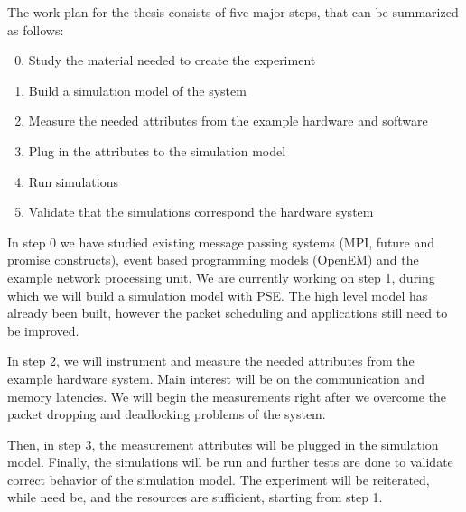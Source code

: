 The work plan for the thesis consists of five major steps, that can be summarized as follows:

\begin{enumerate}
\setcounter{enumi}{-1}
\item Study the material needed to create the experiment
\item Build a simulation model of the system
\item Measure the needed attributes from the example hardware and software
\item Plug in the attributes to the simulation model
\item Run simulations
\item Validate that the simulations correspond the hardware system
\end{enumerate}

In step 0 we have studied existing message passing systems (MPI, future and promise constructs), event based programming models (OpenEM) and the example network processing unit. We are currently working on step 1, during which we will build a simulation model with PSE. The high level model has already been built, however the packet scheduling and applications still need to be improved.

In step 2, we will instrument and measure the needed attributes from the example hardware system. Main interest will be on the communication and memory latencies. We will begin the measurements right after we overcome the packet dropping and deadlocking problems of the system.

Then, in step 3, the measurement attributes will be plugged in the simulation model. Finally, the simulations will be run and further tests are done to validate correct behavior of the simulation model. The experiment will be reiterated, while need be, and the resources are sufficient, starting from step 1.

